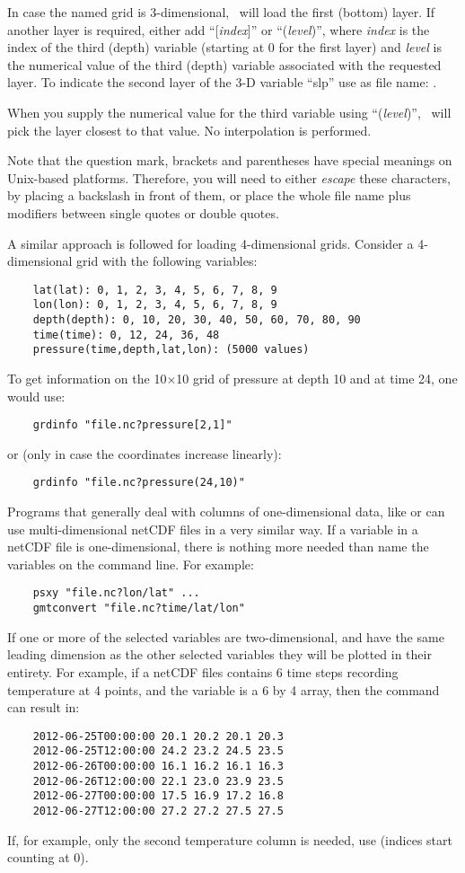 In case the named grid is 3-dimensional, \GMT\ will load the first (bottom) layer. If another
layer is required, either add ``[\emph{index}]'' or ``(\emph{level})'', where \emph{index} is
the index of the third (depth) variable (starting at 0 for the first layer) and \emph{level}
is the numerical value of the third (depth) variable associated with the requested layer.
To indicate the second layer of the 3-D variable ``slp'' use as file name: .

When you supply the numerical value for the third variable using ``(\emph{level})'',
\GMT\ will pick the layer closest to that value. No interpolation is performed.

Note that the question mark, brackets and parentheses have special meanings on Unix-based platforms. Therefore,
you will need to either \emph{escape} these characters, by placing a backslash in front of them, or place the
whole file name plus modifiers between single quotes or double quotes.

A similar approach is followed for loading 4-dimensional grids. Consider a 4-dimensional grid with the following
variables:
\begin{verbatim}
	lat(lat): 0, 1, 2, 3, 4, 5, 6, 7, 8, 9
	lon(lon): 0, 1, 2, 3, 4, 5, 6, 7, 8, 9
	depth(depth): 0, 10, 20, 30, 40, 50, 60, 70, 80, 90
	time(time): 0, 12, 24, 36, 48
	pressure(time,depth,lat,lon): (5000 values)
\end{verbatim}
To get information on the 10$\times$10 grid of pressure at depth 10 and at time 24, one would use:
\begin{verbatim}
	grdinfo "file.nc?pressure[2,1]"
\end{verbatim}
or (only in case the coordinates increase linearly):
\begin{verbatim}
	grdinfo "file.nc?pressure(24,10)"
\end{verbatim}

Programs that generally deal with columns of one-dimensional data, like  or  can use multi-dimensional netCDF
files in a very similar way. If a variable in a netCDF file is one-dimensional, there is nothing more needed than name the variables
on the command line. For example:
\begin{verbatim}
	psxy "file.nc?lon/lat" ...
	gmtconvert "file.nc?time/lat/lon"
\end{verbatim}
If one or more of the selected variables are two-dimensional, and have the same leading dimension as the other selected variables they will
be plotted in their entirety. For example, if a netCDF files contains 6 time steps recording temperature at 4 points, and the variable 
is a 6 by 4 array, then the command  can result in:
\begin{verbatim}
	2012-06-25T00:00:00 20.1 20.2 20.1 20.3
	2012-06-25T12:00:00 24.2 23.2 24.5 23.5
	2012-06-26T00:00:00 16.1 16.2 16.1 16.3
	2012-06-26T12:00:00 22.1 23.0 23.9 23.5
	2012-06-27T00:00:00 17.5 16.9 17.2 16.8
	2012-06-27T12:00:00 27.2 27.2 27.5 27.5
\end{verbatim}
If, for example, only the second temperature column is needed, use  (indices start counting at 0).

